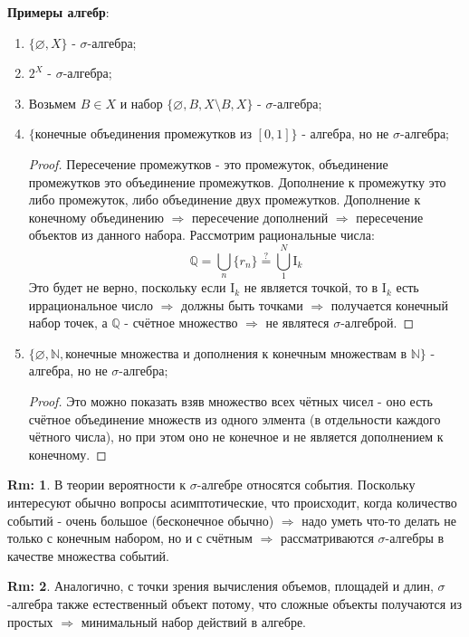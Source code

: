 \documentclass[12pt]{article}
\newcommand{\MQ}{\mathbb{Q}}
\newcommand{\MN}{\mathbb{N}}
\newcommand{\MI}{\mathrm{I}}
\newcommand{\VN}{\varnothing}
\theoremstyle{definition}
\newtheorem{rem}{Rm:}
\begin{document}
\textbf{Примеры алгебр}:
\begin{enumerate}[label=\arabic*)]
	\item $\{\VN,X\}$ - $\sigma$-алгебра;
	\item $2^X$ - $\sigma$-алгебра;
	\item Возьмем $B \in X$ и набор $\{\VN,B, X \setminus B, X \}$ - $\sigma$-алгебра; 
	\item $\{\text{конечные объединения промежутков из } [0,1]\}$ - алгебра, но не $\sigma$-алгебра;
	\begin{proof}
		Пересечение промежутков - это промежуток, объединение промежутков это объединение промежутков. Дополнение к промежутку это либо промежуток, либо объединение двух промежутков. Дополнение к конечному объединению $\Rightarrow$ пересечение дополнений $\Rightarrow$ пересечение объектов из данного набора. Рассмотрим рациональные числа:
		$$
		\MQ = \bigcup\limits_n\{r_n\} \overset{?}{=} \bigcup\limits_{1}^N\MI_k
		$$
		Это будет не верно, поскольку если $\MI_k$ не является точкой, то в $\MI_k$ есть иррациональное число $\Rightarrow$ должны быть точками $\Rightarrow$ получается конечный набор точек, а $\MQ$ - счётное множество $\Rightarrow$ не являтеся $\sigma$-алгеброй.
	\end{proof} 
	\item $\{\VN,\MN, \text{конечные множества и дополнения к конечным множествам в }\MN\}$ - алгебра, но не $\sigma$-алгебра; 
	\begin{proof}
		Это можно показать взяв множество всех чётных чисел - оно есть счётное объединение множеств из одного элмента (в отдельности каждого чётного числа), но при этом оно не конечное и не является дополнением к конечному.
	\end{proof}
\end{enumerate}
\begin{rem}
	В теории вероятности к $\sigma$-алгебре относятся события. Поскольку интересуют обычно вопросы асимптотические, что происходит, когда количество событий - очень большое (бесконечное обычно) $\Rightarrow$ надо уметь что-то делать не только с конечным набором, но и с счётным $\Rightarrow$ рассматриваются $\sigma$-алгебры в качестве множества событий.
\end{rem}
\begin{rem}
	Аналогично, с точки зрения вычисления объемов, площадей и длин, $\sigma$-алгебра также естественный объект потому, что сложные объекты получаются из простых $\Rightarrow$ минимальный набор действий в алгебре.
\end{rem}
\end{document}
